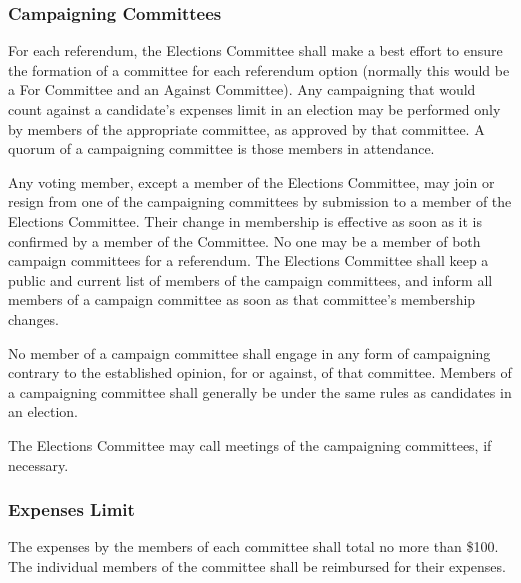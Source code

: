 \subsubsection{Campaigning Committees}
For each referendum, the Elections Committee shall make a best effort to ensure the formation of a committee for each referendum option (normally this would be a For Committee and an Against Committee).
Any campaigning that would count against a candidate's expenses limit in an election may be performed only by members of the appropriate committee, as approved by that committee.
A quorum of a campaigning committee is those members in attendance.

Any voting member, except a member of the Elections Committee, may join or resign from one of the campaigning committees by submission to a member of the Elections Committee.
Their change in membership is effective as soon as it is confirmed by a member of the Committee.
No one may be a member of both campaign committees for a referendum.
The Elections Committee shall keep a public and current list of members of the campaign committees, and inform all members of a campaign committee as soon as that committee's membership changes.

No member of a campaign committee shall engage in any form of campaigning contrary to the established opinion, for or against, of that committee.
Members of a campaigning committee shall generally be under the same rules as candidates in an election.

The Elections Committee may call meetings of the campaigning committees, if necessary.

\subsubsection{Expenses Limit}
The expenses by the members of each committee shall total no more than \$100.
The individual members of the committee shall be reimbursed for their expenses.
